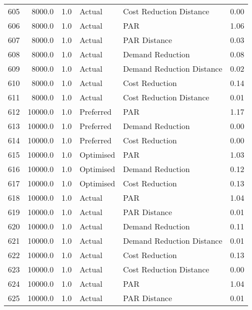 \begin{longtable}{lrrllr}
605  &       8000.0 &     1.0 &         Actual &    Cost Reduction Distance &   0.00 \\
606  &       8000.0 &     1.0 &         Actual &                        PAR &   1.06 \\
607  &       8000.0 &     1.0 &         Actual &               PAR Distance &   0.03 \\
608  &       8000.0 &     1.0 &         Actual &           Demand Reduction &   0.08 \\
609  &       8000.0 &     1.0 &         Actual &  Demand Reduction Distance &   0.02 \\
610  &       8000.0 &     1.0 &         Actual &             Cost Reduction &   0.14 \\
611  &       8000.0 &     1.0 &         Actual &    Cost Reduction Distance &   0.01 \\
612  &      10000.0 &     1.0 &      Preferred &                        PAR &   1.17 \\
613  &      10000.0 &     1.0 &      Preferred &           Demand Reduction &   0.00 \\
614  &      10000.0 &     1.0 &      Preferred &             Cost Reduction &   0.00 \\
615  &      10000.0 &     1.0 &      Optimised &                        PAR &   1.03 \\
616  &      10000.0 &     1.0 &      Optimised &           Demand Reduction &   0.12 \\
617  &      10000.0 &     1.0 &      Optimised &             Cost Reduction &   0.13 \\
618  &      10000.0 &     1.0 &         Actual &                        PAR &   1.04 \\
619  &      10000.0 &     1.0 &         Actual &               PAR Distance &   0.01 \\
620  &      10000.0 &     1.0 &         Actual &           Demand Reduction &   0.11 \\
621  &      10000.0 &     1.0 &         Actual &  Demand Reduction Distance &   0.01 \\
622  &      10000.0 &     1.0 &         Actual &             Cost Reduction &   0.13 \\
623  &      10000.0 &     1.0 &         Actual &    Cost Reduction Distance &   0.00 \\
624  &      10000.0 &     1.0 &         Actual &                        PAR &   1.04 \\
625  &      10000.0 &     1.0 &         Actual &               PAR Distance &   0.01 \\

\end{longtable}
